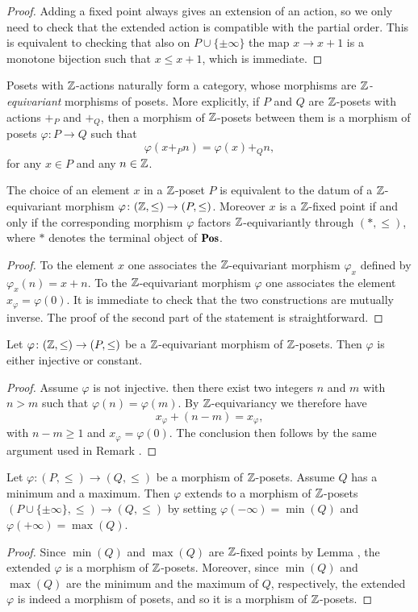 \documentclass[a4paper,12pt]{amsart}
\begin{document}
\begin{proof}
 Adding a fixed point always gives an extension of an action, so we only need to check that the extended action is compatible with the partial order. This is equivalent to checking that also on $P\cup\{\pm\infty\}$ the map $x\to x+1$ is a monotone bijection such that $x\leq x+1$, which is immediate. 
\end{proof}
Posets with $\mathbb{Z} $-actions naturally form a category, whose morphisms are \emph{$\mathbb{Z} $-equivariant} morphisms of posets. More explicitly, if $P$ and $Q$ are $\mathbb{Z} $-posets with actions $+_P$ and $+_Q$, then a morphism of $\mathbb{Z} $-posets between them is a morphism of posets $\varphi\colon P\to Q$ such that
\[
\varphi(x+_P n)=\varphi(x)+_Q n,
\]
for any $x\in P$ and any $n\in \mathbb{Z} $.
\begin{lemma}\label{trivial.but.useful2}
The choice of an element $x$ in a $\mathbb{Z} $-poset $P$ is equivalent to the datum of a $\mathbb{Z} $-equivariant morphism $\varphi\colon(\mathbb{Z} ,\leq)\to (P,\leq)$. Moreover $x$ is a $\mathbb{Z} $-fixed point if and only if the corresponding morphism $\varphi$ factors $\mathbb{Z} $-equivariantly through $(*,\leq)$, where $*$ denotes the terminal object of $\cate{Pos}$. 
 \end{lemma}
\begin{proof}
To the element $x$ one associates the $\mathbb{Z} $-equivariant morphism $\varphi_x$ defined by $\varphi_x(n)=x+n$. To the $\mathbb{Z} $-equivariant morphism $\varphi$ one associates the element $x_\varphi=\varphi(0)$. It is immediate to check that the two constructions are mutually inverse. The proof of the second part of the statement is straightforward.
\end{proof}
\begin{lemma}
Let $\varphi\colon(\mathbb{Z} ,\leq)\to (P,\leq)$ be a $\mathbb{Z} $-equivariant morphism of $\mathbb{Z} $-posets. Then $\varphi$ is either injective or constant.
\end{lemma}
\begin{proof}
Assume $\varphi$ is not injective. then there exist two integers $n$ and $m$ with $n>m$ such that $\varphi(n)=\varphi(m)$. By $\mathbb{Z} $-equivariancy we therefore have
\[
x_\varphi+(n-m)=x_\varphi,
\]
with $n-m\geq 1$ and $x_\varphi=\varphi(0)$. The conclusion then follows by the same argument used in Remark .
\end{proof}
\begin{lemma}\label{extends}
Let $\varphi\colon (P,\leq)\to (Q,\leq)$ be a morphism of $\mathbb{Z} $-posets. Assume $Q$ has a minimum and a maximum. Then $\varphi$ extends to a morphism of $\mathbb{Z} $-posets $(P\cup\{\pm\infty\},\leq)\to (Q,\leq)$ by setting $\varphi(-\infty)=\min(Q)$ and $\varphi(+\infty)=\max(Q)$.
\end{lemma}
\begin{proof}
Since $\min(Q)$ and $\max(Q)$ are $\mathbb{Z} $-fixed points by Lemma , the extended $\varphi$ is a morphism of $\mathbb{Z} $-posets. Moreover, since $\min(Q)$ and $\max(Q)$ are the minimum and the maximum of $Q$, respectively, the extended $\varphi$ is indeed a morphism of posets, and so it is a morphism of $\mathbb{Z} $-posets.
\end{proof}
\end{document}
